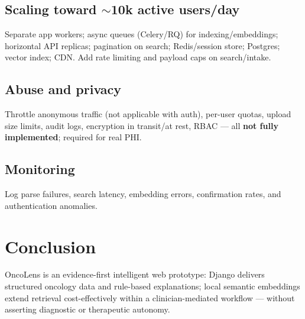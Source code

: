 \documentclass[11pt]{article}
\begin{document}
\subsection{Scaling toward $\sim$10k active users/day}
Separate app workers; async queues (Celery/RQ) for indexing/embeddings; horizontal API replicas; pagination on search; Redis/session store; Postgres; vector index; CDN. Add rate limiting and payload caps on search/intake.

\subsection{Abuse and privacy}
Throttle anonymous traffic (not applicable with auth), per-user quotas, upload size limits, audit logs, encryption in transit/at rest, RBAC --- all \textbf{not fully implemented}; required for real PHI.

\subsection{Monitoring}
Log parse failures, search latency, embedding errors, confirmation rates, and authentication anomalies.

\section{Conclusion}
OncoLens is an evidence-first intelligent web prototype: Django delivers structured oncology data and rule-based explanations; local semantic embeddings extend retrieval cost-effectively within a clinician-mediated workflow --- without asserting diagnostic or therapeutic autonomy.
\end{document}
